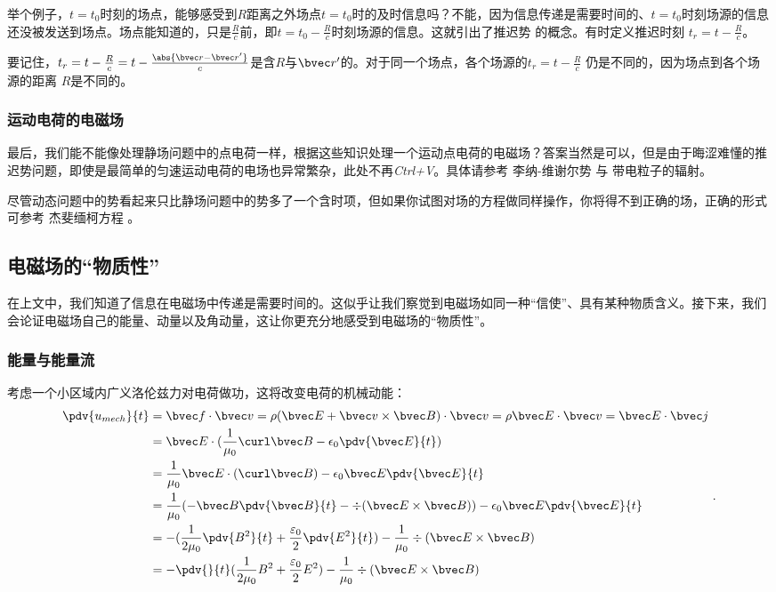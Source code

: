 举个例子，$t=t_0$时刻的场点，能够感受到$R$距离之外场点$t=t_0$时的及时信息吗？不能，因为信息传递是需要时间的、$t=t_0$时刻场源的信息还没被发送到场点。场点能知道的，只是$\frac{R}{c}$前，即$t=t_0-\frac{R}{c}$时刻场源的信息。这就引出了推迟势  的概念。有时定义推迟时刻 $t_r = t - \frac{R}{c}$。

要记住，$t_r = t-\frac{R}{c} = t-\frac{\abs{\bvec r-\bvec r'}}{c}$是含$R$与$\bvec r'$的。对于同一个场点，各个场源的$t_r = t - \frac{R}{c}$ 仍是不同的，因为场点到各个场源的距离 $R$是不同的。


\subsubsection{运动电荷的电磁场}
最后，我们能不能像处理静场问题中的点电荷一样，根据这些知识处理一个运动点电荷的电磁场？答案当然是可以，但是由于晦涩难懂的推迟势问题，即使是最简单的匀速运动电荷的电场也异常繁杂，此处不再\textsl{Ctrl+V}。具体请参考 李纳-维谢尔势 与 带电粒子的辐射。

尽管动态问题中的势看起来只比静场问题中的势多了一个含时项，但如果你试图对场的方程做同样操作，你将得不到正确的场，正确的形式可参考 杰斐缅柯方程 \cite{GriffE}。

\subsection{电磁场的“物质性”}
在上文中，我们知道了信息在电磁场中传递是需要时间的。这似乎让我们察觉到电磁场如同一种“信使”、具有某种物质含义。接下来，我们会论证电磁场自己的能量、动量以及角动量，这让你更充分地感受到电磁场的“物质性”。

\subsubsection{能量与能量流} 
考虑一个小区域内广义洛伦兹力对电荷做功，这将改变电荷的机械动能：
$$
\begin{aligned}
\pdv{u_{mech}}{t} &= \bvec f \cdot \bvec v = \rho (\bvec E + \bvec v \times \bvec B)\cdot \bvec v = \rho \bvec E \cdot \bvec v = \bvec E \cdot \bvec j \\
 & = \bvec E \cdot (\frac{1}{\mu_0} \curl \bvec B - \epsilon_0 \pdv{\bvec E}{t})\\
 & = \frac{1}{\mu_0} \bvec E \cdot (\curl \bvec B) - \epsilon_0 \bvec E \pdv{\bvec E}{t}\\
 & = \frac{1}{\mu_0} (-\bvec B \pdv{\bvec B}{t} - \div(\bvec E \times \bvec B))- \epsilon_0 \bvec E \pdv{\bvec E}{t}\\
 & = - (\frac{1}{2\mu_0} \pdv{B^2}{t} + \frac{\varepsilon_0}{2} \pdv{E^2}{t}) - \frac{1}{\mu_0} \div(\bvec E \times \bvec B)\\
 & = - \pdv{}{t} (\frac{1}{2\mu_0} B^2 + \frac{\varepsilon_0}{2} E^2) - \frac{1}{\mu_0} \div(\bvec E \times \bvec B)
\end{aligned}
~.
$$

